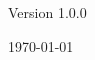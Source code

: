 
\begin{center}
\begin{bfseries}
\bigskip
\bigskip

Version 1.0.0

\bigskip

\today

\end{bfseries}
\end{center}
